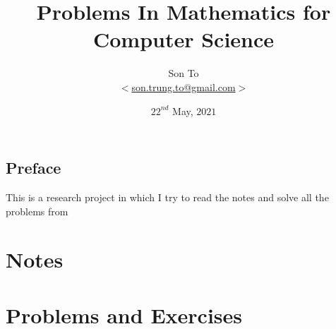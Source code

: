 \documentclass[a4paper,11pt]{memoir}
\theoremstyle{plain} \newtheorem{lemNotes}{Lemma}[chapter]
\theoremstyle{definition} \newtheorem{pr}{Problem}[chapter]
\theoremstyle{remark}     \newtheorem{ab}{Remark}[chapter]
\theoremstyle{plain} \newtheorem{lemPr}{Lemma}[pr]
\begin{document}
    
    \title{Problems In Mathematics for Computer Science}
    \author{Son To\\
    $<$\href{mailto:son.trung.to@gmail.com}%
    {son.trung.to@gmail.com}$>$}
    \date{$22^{nd}$ May, $2021$}

    \maketitle
    \makeatletter
    \thispagestyle{empty}
    \def\cleardoublepage{\clearpage\if@twoside
        \ifodd\c@page\else
            \hbox{}
            \vspace*{\fill}
            \begin{center}
                \doublenote
            \end{center}
            \vspace*{\fill}
            \thispagestyle{empty}
            \newpage
            \if@twocolumn\hbox{}\newpage\fi
        \fi
    \fi
    }
    \newcommand{\mylabel}[2]{#2\def\@currentlabel{#2}\label{#1}}
    \def\@endpart{\vfill\newpage
        \if@twoside
            \if@openright
                \null
                \thispagestyle{empty}
                \vspace*{\fill}
                \begin{quote}
                    \partnote
                \end{quote}
                \vspace*{\fill}
                \newpage
            \fi
        \fi
        \if@tempswa
            \twocolumn
        \fi
    }
    \newcommand{\partnote}{}
    \newcommand{\doublenote}{}
    \makeatother
    \frontmatter
        \chapter{Preface}
            This is a research project in which I try to read
            the notes and solve all the problems
            from \cite{lehman2018}
        \clearpage
        \tableofcontents

    \mainmatter
    \part{Notes}
        
    \part{Problems and Exercises}
        

    
    
\end{document}
